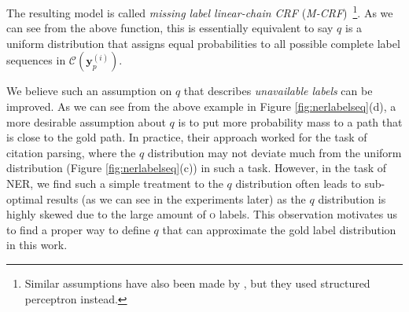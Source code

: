 The resulting model is called {\em missing label linear-chain CRF} ({\em M-CRF})~\footnote{Similar assumptions have also been made by \cite{carlson2009learning,fernandes2011learning}, but they used structured perceptron \cite{collins2002discriminative} instead.}. As we can see from the above function, this is essentially equivalent to say $q$ is a uniform distribution that assigns equal probabilities to all possible complete label sequences in $\mathcal{C}(\mathbf{y}_p^{(i)})$.

We believe such an assumption on $q$ that describes {\em unavailable labels} can be improved. As we can see from the above example in Figure \ref{fig:nerlabelseq}(d), a more desirable assumption about $q$ is to put more probability mass to a path that is close to the gold path. 
In practice, their approach worked for the task of citation parsing, where the $q$ distribution may not deviate much from the uniform distribution (Figure \ref{fig:nerlabelseq}(c)) in such a task. However, in the task of NER, we find such a simple treatment to the $q$ distribution often leads to sub-optimal results (as we can see in the experiments later) as the $q$ distribution is highly skewed due to the large amount of \textsc{o} labels.
This observation motivates us to find a proper way to define $q$ that can approximate the gold label distribution in this work.



